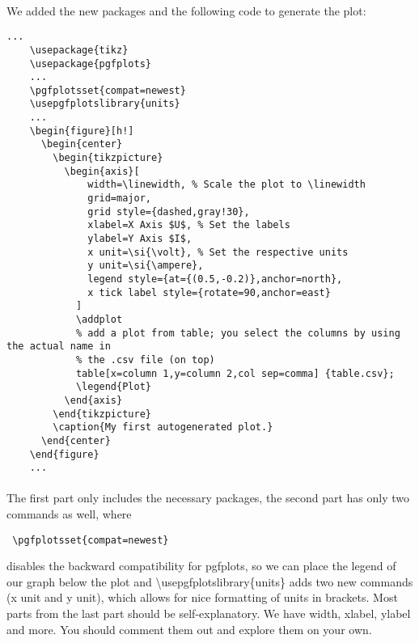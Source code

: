   \paragraph{}
  We added the new packages and the following code to generate the plot:
  \begin{lstlisting}[language={[LaTeX]TeX},breaklines=true,frame=single]
    ...
    \usepackage{tikz}
    \usepackage{pgfplots}
    ...
    \pgfplotsset{compat=newest}
    \usepgfplotslibrary{units}
    ...
    \begin{figure}[h!]
      \begin{center}
        \begin{tikzpicture}
          \begin{axis}[
              width=\linewidth, % Scale the plot to \linewidth
              grid=major, 
              grid style={dashed,gray!30},
              xlabel=X Axis $U$, % Set the labels
              ylabel=Y Axis $I$,
              x unit=\si{\volt}, % Set the respective units
              y unit=\si{\ampere},
              legend style={at={(0.5,-0.2)},anchor=north},
              x tick label style={rotate=90,anchor=east}
            ]
            \addplot 
            % add a plot from table; you select the columns by using the actual name in
            % the .csv file (on top)
            table[x=column 1,y=column 2,col sep=comma] {table.csv}; 
            \legend{Plot}
          \end{axis}
        \end{tikzpicture}
        \caption{My first autogenerated plot.}
      \end{center}
    \end{figure}
    ...
  \end{lstlisting}
  \paragraph{}
    The first part only includes the necessary packages, 
    the second part has only two commands as well, where
    \begin{verbatim} \pgfplotsset{compat=newest} \end{verbatim} 
    disables the backward compatibility for pgfplots, so we can
    place the legend of our graph below the plot and 
    \textbackslash usepgfplotslibrary\{units\} adds two new
    commands (x unit and y unit), which allows for nice formatting 
    of units in brackets. Most parts from the last part should be 
    self-explanatory. We have width, xlabel, ylabel and more. You
    should comment them out and explore them on your own.
